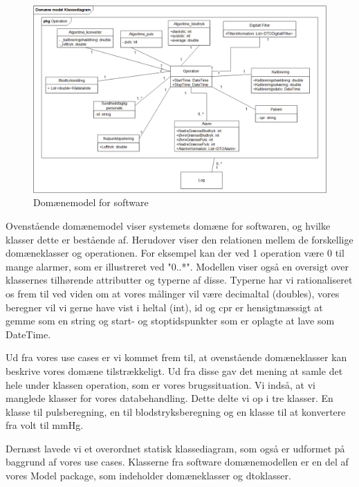 \clearpage

\begin{figure}[h!]
	\centering
	\includegraphics[width=1\linewidth]{Arkitektur_og_design/Softwarearkitektur/classdomain}	
	\caption{Domænemodel for software}
	\label{fig:classdomain}
\end{figure}

Ovenstående domænemodel viser systemets domæne for softwaren, og hvilke klasser dette er bestående af.  Herudover viser den relationen mellem de forskellige domæneklasser og operationen. For eksempel kan der ved 1 operation være 0 til mange alarmer, som er illustreret ved "0..*". Modellen viser også en oversigt over klassernes tilhørende attributter og typerne af disse. Typerne har vi rationaliseret os frem til ved viden om at vores målinger vil være decimaltal (doubles), vores beregner vil vi gerne have vist i heltal (int), id og cpr er hensigtmæssigt at gemme som en string og start- og stoptidspunkter som er oplagte at lave som DateTime.
 
Ud fra vores use cases er vi kommet frem til, at ovenstående domæneklasser kan beskrive vores domæne tilstrækkeligt. Ud fra disse gav det mening at samle det hele under klassen operation, som er vores brugssituation. Vi indså, at vi manglede klasser for vores databehandling. Dette delte vi op i tre klasser. En klasse til pulsberegning, en til blodstryksberegning og en klasse til at konvertere fra volt til mmHg. 

Dernæst lavede vi et overordnet statisk klassediagram, som også er udformet på baggrund af vores use cases. Klasserne fra software domænemodellen er en del af vores Model package, som indeholder domæneklasser og dtoklasser. 

\clearpage

